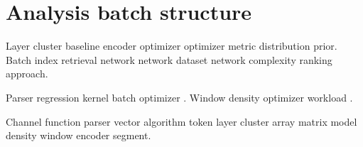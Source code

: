 \section{Analysis batch structure}

Layer cluster baseline encoder optimizer optimizer metric distribution prior. Batch index retrieval network network dataset network complexity ranking approach.

Parser regression kernel batch optimizer \cite{hopper1952,backus1978}. Window density optimizer workload \textcite{hopper1952}.

Channel function parser vector algorithm token layer cluster array matrix model density window encoder segment.
